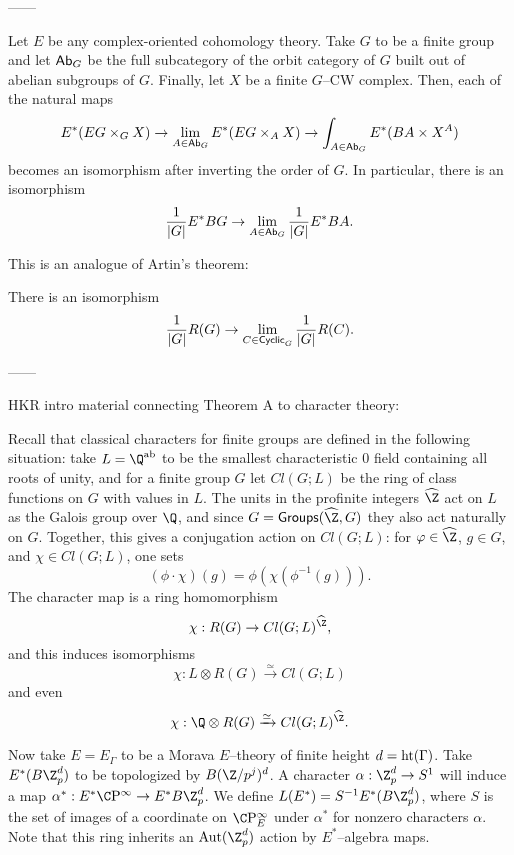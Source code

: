 ------

\begin{theorem}
Let $E$ be any complex-oriented cohomology theory.  Take $G$ to be a finite group and let $\mathsf{Ab}_G$ be the full subcategory of the orbit category of $G$ built out of abelian subgroups of $G$.  Finally, let $X$ be a finite $G$--CW complex.  Then, each of the natural maps \[E^*(EG \times_G X) \to \lim_{A \in \mathsf{Ab}_G} E^*(EG \times_A X) \to \int_{A \in \mathsf{Ab}_G} E^*(BA \times X^A)\] becomes an isomorphism after inverting the order of $G$.  In particular, there is an isomorphism \[\frac{1}{|G|} E^* BG \to \lim_{A \in \CatOf{Ab}_G} \frac{1}{|G|} E^* BA. \qed\]
\end{theorem}

This is an analogue of Artin's theorem:
\begin{theorem}
There is an isomorphism \[\frac{1}{|G|} R(G) \to \lim_{C \in \CatOf{Cyclic}_G} \frac{1}{|G|} R(C). \qed\]
\end{theorem}


------

HKR intro material connecting Theorem A to character theory:

Recall that classical characters for finite groups are defined in the following situation: take $L = \Q^{\mathrm{ab}}$ to be the smallest characteristic $0$ field containing all roots of unity, and for a finite group $G$ let $Cl(G; L)$ be the ring of class functions on $G$ with values in $L$.  The units in the profinite integers $\widehat{\Z}$ act on $L$ as the Galois group over $\Q$, and since $G = \CatOf{Groups}(\widehat{\Z}, G)$ they also act naturally on $G$.  Together, this gives a conjugation action on $Cl(G; L)$: for $\phi \in \widehat{\Z}$, $g \in G$, and $\chi \in Cl(G; L)$, one sets \[(\phi \cdot \chi)(g) = \phi(\chi(\phi^{-1}(g))).\]  The character map is a ring homomorphism \[\chi: R(G) \to Cl(G; L)^{\widehat{\Z}},\] and this induces isomorphisms \[\chi: L \otimes R(G) \xrightarrow{\simeq} Cl(G; L)\] and even \[\chi: \Q \otimes R(G) \xrightarrow{\simeq} Cl(G; L)^{\widehat{\Z}}.\]

Now take $E = E_\Gamma$ to be a Morava $E$--theory of finite height $d = \operatorname{ht}(\Gamma)$.  Take $E^*(B\Z_p^d)$ to be topologized by $B(\Z/p^j)^d$.  A character $\alpha: \Z_p^d \to S^1$ will induce a map $\alpha^*: E^* \CP^\infty \to E^* B\Z_p^d$.  We define $L(E^*) = S^{-1} E^*(B\Z_p^d)$, where $S$ is the set of images of a coordinate on $\CP^\infty_E$ under $\alpha^*$ for nonzero characters $\alpha$.  Note that this ring inherits an $\operatorname{Aut}(\Z_p^d)$ action by $E^*$--algebra maps.

